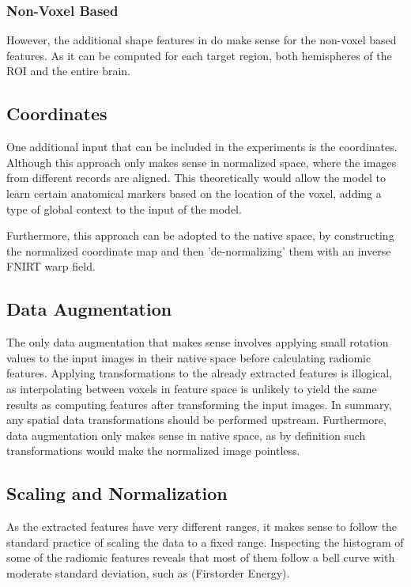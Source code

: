 \subsubsection{Non-Voxel Based}

However, the additional shape features in  do make sense for the non-voxel based features. As it can be computed for each target region, both hemispheres of the \ac{ROI} and the entire brain.

\subsection{Coordinates}

One additional input that can be included in the experiments is the coordinates. Although this approach only makes sense in normalized space, where the images from different records are aligned. This theoretically would allow the model to learn certain anatomical markers based on the location of the voxel, adding a type of global context to the input of the model.\par
Furthermore, this approach can be adopted to the native space, by constructing the normalized coordinate map and then 'de-normalizing' them with an inverse \ac{FNIRT} warp field.

\subsection{Data Augmentation}

The only data augmentation that makes sense involves applying small rotation values to the input images in their native space before calculating radiomic features. Applying transformations to the already extracted features is illogical, as interpolating between voxels in feature space is unlikely to yield the same results as computing features after transforming the input images. In summary, any spatial data transformations should be performed upstream. Furthermore, data augmentation only makes sense in native space, as by definition such transformations would make the normalized image pointless.

\subsection{Scaling and Normalization}
\label{sec:norm}

As the extracted features have very different ranges, it makes sense to follow the standard practice of scaling the data to a fixed range. Inspecting the histogram of some of the radiomic features reveals that most of them follow a bell curve with moderate standard deviation, such as  (Firstorder Energy).\par

